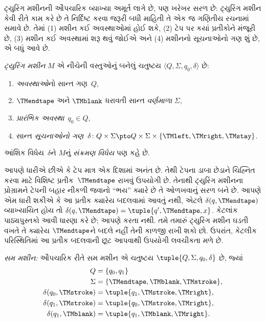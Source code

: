 \documentclass[../../../include/open-logic-section]{subfiles}
\begin{document}

\begin{explain}
ટ્યુરિંગ મશીનની ઔપચારિક વ્યાખ્યા અમૂર્ત લાગે છે, પણ ખરેખર
સરળ છે: ટ્યુરિંગ મશીન કેવી રીતે કામ કરે છે તે નિર્દિષ્ટ કરવા
જરૂરી બધી માહિતી તે એક જ ગણિતીય રચનામાં સમાવે છે. તેમાં
(1) મશીન કઈ અવસ્થાઓમાં હોઈ શકે, (2) ટેપ પર કયાં પ્રતીકોને
મંજૂરી છે, (3) મશીન કઈ અવસ્થામાં શરૂ થવું જોઈએ અને
(4) મશીનનો સૂચનાઓનો ગણ શું છે, એ બધું આવે છે.
\end{explain}

\begin{defn}[ટ્યુરિંગ મશીન]
\emph{ટ્યુરિંગ મશીન} $M$ એ નીચેની વસ્તુઓનું બનેલું ચતુષ્ટય
$\langle Q, \Sigma, q_0, \delta\rangle$ છે:
\begin{enumerate}
\item \emph{અવસ્થાઓ}નો સાન્ત ગણ~$Q$,
\item $\TMendtape$ અને $\TMblank$ ધરાવતી સાન્ત \emph{વર્ણમાળા}
  $\Sigma$,
\item \emph{પ્રારંભિક અવસ્થા}~$q_0 \in Q$,
\item સાન્ત \emph{સૂચનાઓનો ગણ}~$\delta\colon Q \times \Sigma
  \pto Q \times \Sigma \times \{\TMleft, \TMright, \TMstay\}$.
\end{enumerate}
આંશિક વિધેય~$\delta$ને $M$નું \emph{સંક્રમણ વિધેય}
પણ કહે છે.
\end{defn}

\begin{explain}
આપણે ધારીએ છીએ કે ટેપ માત્ર એક દિશામાં અનંત છે.
તેથી ટેપના ડાબા છેડાને ચિહ્નિત કરવા માટે વિશિષ્ટ
પ્રતીક~$\TMendtape$ રાખવું ઉપયોગી છે. તેનાથી ટ્યુરિંગ
મશીનના પ્રોગ્રામને ટેપની બહાર નીકળી જવાનો ``ભય'' ક્યારે
છે તે ઓળખવાનું સરળ બને છે. આપણે એમ ધારી શકીએ કે આ
પ્રતીક ક્યારેય બદલવામાં આવતું નથી, એટલે
$\delta(q,\TMendtape)$ વ્યાખ્યાયિત હોય તો
$\delta(q,\TMendtape) = \tuple{q', \TMendtape, x}$.
કેટલાંક પાઠ્યપુસ્તકો આવી ધારણા કરે છે; આપણે કરતા નથી.
તમે તમારું ટ્યુરિંગ મશીન ઘડતી વખતે તે ક્યારેય
$\TMendtape$ને બદલે નહીં તેની કાળજી રાખી શકો છો.
ઉપરાંત, કેટલીક પરિસ્થિતિમાં આ પ્રતીક બદલવાની છૂટ
આપવાથી ઉપયોગી લવચીકતા મળે છે.
\end{explain}

\begin{ex}
\emph{સમ મશીન:} ઔપચારિક રીતે સમ મશીન એ ચતુષ્ટય
$\tuple{Q, \Sigma, q_0, \delta}$ છે, જ્યાં
\begin{align*}
Q & = \{ q_0, q_1 \} \\
\Sigma & = \{ \TMendtape, \TMblank, \TMstroke \}, \\
\delta(q_0, \TMstroke) & = \tuple{q_1, \TMstroke, \TMright},\\
\delta(q_1, \TMstroke) & = \tuple{q_0, \TMstroke, \TMright},\\
\delta(q_1, \TMblank)  & = \tuple{q_1, \TMblank, \TMright}.
\end{align*}
\end{ex}
\end{document}
